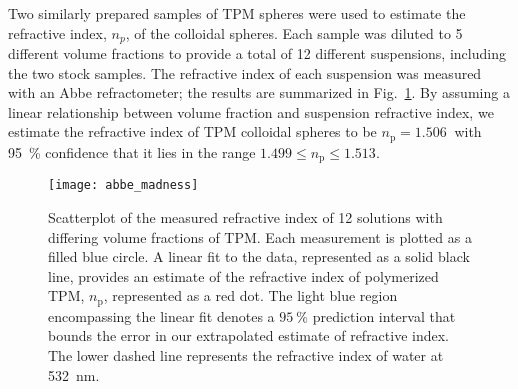 Two similarly prepared samples of TPM spheres were used to estimate the refractive
index, $n_p$, of the colloidal spheres.
Each sample was diluted to \num{5} different volume fractions to provide a total of
\num{12} different suspensions, including the two stock samples.
The refractive index of each
suspension was measured with an Abbe refractometer;
the results are summarized in Fig.~\ref{fig:abbe}.
By assuming a linear relationship between volume fraction and suspension refractive
index, we estimate the refractive index of TPM colloidal spheres to be $n_{\text{p}} = \SI{1.506}{}$ with \SI{95}{\percent} confidence that it lies in the range $1.499 \le n_{\text{p}} \le 1.513$.

\begin{figure}
    \centering
    \texttt{[image: abbe\_madness]}
    \caption{Scatterplot of the measured refractive index of \num{12} solutions
      with differing volume fractions of TPM. Each measurement is plotted as a filled
      blue circle.
      A linear fit to the data, represented as a solid black line, provides an estimate of
      the refractive index of polymerized TPM, $n_{\text{p}}$, represented as a red dot.
      The light blue region encompassing the linear fit denotes a $\SI{95}{\percent}$
      prediction interval that bounds the error in our extrapolated estimate of refractive
      index.
      The lower dashed line represents the refractive index of water at \SI{532}{\nm}.}
    \label{fig:abbe}
\end{figure}


